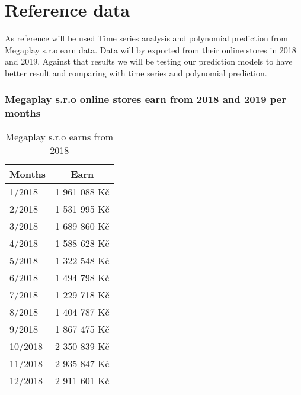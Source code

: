 
\chapter{Reference data} \label{reference_data}

As reference will be used Time series analysis and polynomial prediction from Megaplay s.r.o earn data. Data will by exported from their online stores in 2018 and 2019.
Against that results we will be testing our prediction models to have better result and comparing with time series and polynomial prediction.
\subsection{Megaplay s.r.o online stores earn from 2018 and 2019 per months}
\begin{table}[h!]
    \begin{center}
        \begin{tabular}{ | l | c | }
            \hline
            {\textbf{Months}} & \textbf{Earn} \\
            \hline
            1/2018 & 1 961 088 Kč \\
            \hline
            2/2018 & 1 531 995 Kč \\
            \hline
            3/2018 & 1 689 860 Kč \\
            \hline
            4/2018 & 1 588 628 Kč \\
            \hline
            5/2018 & 1 322 548 Kč \\
            \hline
            6/2018 & 1 494 798 Kč \\
            \hline
            7/2018 & 1 229 718 Kč \\
            \hline
            8/2018 & 1 404 787 Kč \\
            \hline
            9/2018 & 1 867 475 Kč \\
            \hline
            10/2018 & 2 350 839 Kč \\
            \hline
            11/2018 & 2 935 847 Kč \\
            \hline
            12/2018 & 2 911 601 Kč \\
            \hline
        \end{tabular}
    \end{center}
    \caption{Megaplay s.r.o earns from 2018}
    \label{Megaplay s.r.o earns from 2018}
\end{table}
